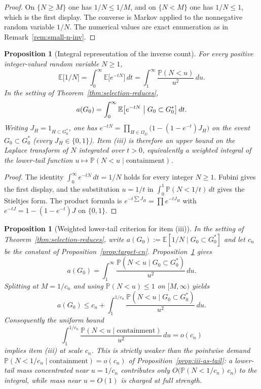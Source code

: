 \documentclass[11pt]{article}
\newtheorem{proposition}[theorem]{Proposition}
\newcommand{\EE}{\mathbb{E}}
\newcommand{\PP}{\mathbb{P}}
\begin{document}
\begin{proof}
On \(\{N\ge M\}\) one has \(1/N\le 1/M\), and on \(\{N<M\}\) one has
\(1/N\le 1\), which is the first display.
The converse is Markov applied to the nonnegative random variable \(1/N\).
The numerical values are exact enumeration as in Remark~\ref{rem:small-n-inv}.
\end{proof}

\begin{proposition}[Integral representation of the inverse count]
\label{prop:integral-a}
For every positive integer-valued random variable \(N\ge 1\),
\[
\EE\bigl[1/N\bigr]
=
\int_0^\infty\EE\bigl[e^{-tN}\bigr]\,dt
=
\int_1^\infty\frac{\PP(N<u)}{u^2}\,du.
\]
In the setting of Theorem~\ref{thm:selection-reduces},
\[
a(G_0)
=
\int_0^\infty\EE\bigl[e^{-tN}\bigm|G_0\subset G^*_0\bigr]\,dt.
\]
Writing \(J_H=1_{H\subset G^*_0}\), one has
\(e^{-tN}=\prod_{H\in\Omega_D}\bigl(1-(1-e^{-t})J_H\bigr)\) on the event
\(G_0\subset G^*_0\) (every \(J_H\in\{0,1\}\)).
Item (iii) is therefore an upper bound on the Laplace transform of \(N\)
integrated over \(t>0\), equivalently a weighted integral of the lower-tail
function \(u\mapsto\PP(N<u\mid\text{containment})\).
\end{proposition}

\begin{proof}
The identity \(\int_0^\infty e^{-tN}\,dt=1/N\) holds for every integer \(N\ge 1\).
Fubini gives the first display, and the substitution \(u=1/t\) in
\(\int_0^1\PP(N<1/t)\,dt\) gives the Stieltjes form.
The product formula is \(e^{-t\sum J_H}=\prod e^{-tJ_H}\) with
\(e^{-tJ}=1-(1-e^{-t})J\) on \(\{0,1\}\).
\end{proof}

\begin{proposition}[Weighted lower-tail criterion for item (iii)]
\label{prop:iii-weighted-tail}
In the setting of Theorem~\ref{thm:selection-reduces}, write
\(a(G_0):=\EE[1/N\mid G_0\subset G^*_0]\) and let \(c_n\) be the constant of
Proposition~\ref{prop:target-cn}. Proposition~\ref{prop:integral-a} gives
\[
a(G_0)
=
\int_1^\infty\frac{\PP(N<u\mid G_0\subset G^*_0)}{u^2}\,du.
\]
Splitting at \(M=1/c_n\) and using \(\PP(N<u)\le 1\) on \([M,\infty)\) yields
\[
a(G_0)
\le
c_n
+
\int_1^{1/c_n}\frac{\PP(N<u\mid G_0\subset G^*_0)}{u^2}\,du.
\]
Consequently the uniform bound
\[
\int_1^{1/c_n}\frac{\PP(N<u\mid\text{containment})}{u^2}\,du
=
o(c_n)
\]
implies item (iii) at scale \(c_n\). This is strictly weaker than the pointwise
demand \(\PP(N<1/c_n\mid\text{containment})=o(c_n)\) of
Proposition~\ref{prop:iii-as-tail}: a lower-tail mass concentrated near
\(u=1/c_n\) contributes only \(O\bigl(\PP(N<1/c_n)\,c_n\bigr)\) to the
integral, while mass near \(u=O(1)\) is charged at full strength.
\end{proposition}
\end{document}
